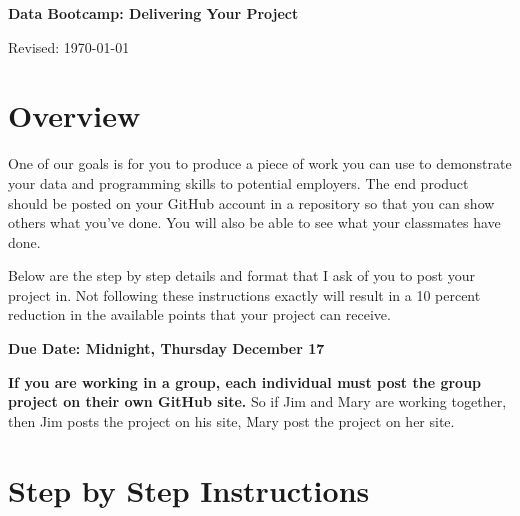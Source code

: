 


\pagestyle{headandfoot}
\runningheadrule
\firstpageheadrule
{}
\runningfooter{}{}{}



\bigskip\bigskip
\centerline{\Large \bf Data Bootcamp:  Delivering Your Project}
\centerline{Revised: \today}

\section*{Overview}

One of our goals is for you to produce a piece of work you can use to demonstrate your data and programming skills to potential employers. The end product should be posted on your GitHub account in a repository so that
you can show others what you've done. You will also be able to see what your classmates have done.

Below are the step by step details and format that I ask of you to post your project in. Not following these instructions exactly will result in a 10 percent reduction in the available points that your project can receive.

\textbf{Due Date: Midnight, Thursday December 17}

\textbf{If you are working in a group, each individual must post the group project on their own GitHub site.} So if Jim and Mary are working together, then Jim posts the project on his site, Mary post the project on her site.

\section*{Step by Step Instructions}

